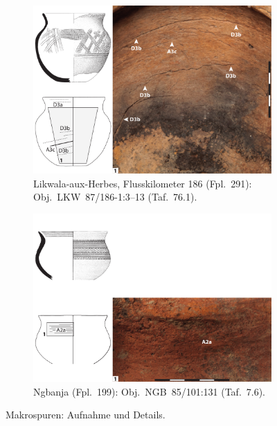 \begin{multicols}{2}
\begin{figure}[p]
	\centering
	\begin{subfigure}{\textwidth}
		\centering
		\includegraphics[width = \textwidth]{fig/Abb_Macrotraces/LKW87-186-1_3-13.pdf}
		\caption{Likwala-aux-Herbes, Flusskilometer 186 (Fpl.~291): Obj.~LKW~87/186-1:3--13 (Taf.~76.1).\vspace{1em}}
		\label{LKW87-186-1_3-13_Makrospuren}
	\end{subfigure}
	\begin{subfigure}{\textwidth}
		\centering
		\includegraphics[width = \textwidth]{fig/Abb_Macrotraces/NGB85-101-130.pdf}
		\caption{\mbox{Ngbanja} (Fpl.~199): Obj.~NGB~85/101:131 (Taf.~7.6).}
		\label{NGB85-101-130-01_Makrospuren}
	\end{subfigure}
	\caption{Makrospuren: Aufnahme und Details.}
\end{figure}


\end{multicols}
